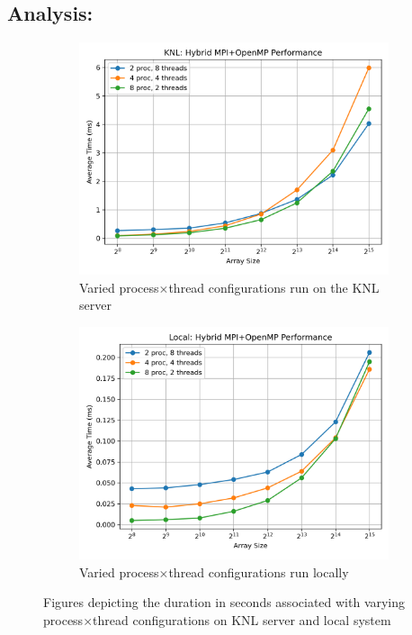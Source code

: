 \documentclass[11pt]{article}
\begin{document}
\subsection*{Analysis:}

\begin{figure}
\centering
\begin{subfigure}[t]{0.48\textwidth}
  \centering
    \includegraphics[width=\textwidth]{./images/knlq7.png}
  \caption{Varied process$\times$thread configurations run on the KNL server}\label{fig:knlq7}
\end{subfigure}%
\hfill
\begin{subfigure}[t]{0.48\textwidth}
  \centering
    \includegraphics[width=\textwidth]{./images/localq7.png}
  \caption{Varied process$\times$thread configurations run locally}\label{fig:localq7}
\end{subfigure}%
\caption{Figures depicting the duration in seconds associated with varying process$\times$thread configurations on KNL server and local system}
\label{fig:gq7}
\end{figure}
\end{document}

